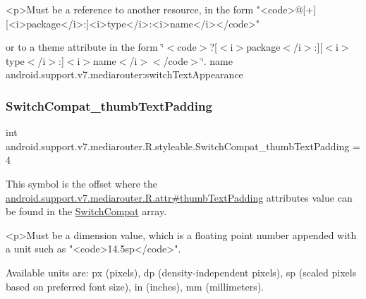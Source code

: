 \begin{DoxyVerb}      <p>Must be a reference to another resource, in the form "<code>@[+][<i>package</i>:]<i>type</i>:<i>name</i></code>"
\end{DoxyVerb}
 or to a theme attribute in the form \char`\"{}$<$code$>$?\mbox{[}$<$i$>$package$<$/i$>$\+:\mbox{]}\mbox{[}$<$i$>$type$<$/i$>$\+:\mbox{]}$<$i$>$name$<$/i$>$$<$/code$>$\char`\"{}.  name android.\+support.\+v7.\+mediarouter\+:switch\+Text\+Appearance \mbox{\label{classandroid_1_1support_1_1v7_1_1mediarouter_1_1R_1_1styleable_a02e44ff90f9d164c673496e2b783fb7d}} 
\subsubsection{\texorpdfstring{Switch\+Compat\+\_\+thumb\+Text\+Padding}{SwitchCompat\_thumbTextPadding}}
{\footnotesize\ttfamily int android.\+support.\+v7.\+mediarouter.\+R.\+styleable.\+Switch\+Compat\+\_\+thumb\+Text\+Padding = 4\hspace{0.3cm}{\ttfamily [static]}}

This symbol is the offset where the \hyperlink{classandroid_1_1support_1_1v7_1_1mediarouter_1_1R_1_1attr_a7468fae21c1543c65b63c2dc30a2d332}{android.\+support.\+v7.\+mediarouter.\+R.\+attr\#thumb\+Text\+Padding} attribute\textquotesingle{}s value can be found in the \hyperlink{classandroid_1_1support_1_1v7_1_1mediarouter_1_1R_1_1styleable_af5c7f83276b6c88619833dc8bebeacd9}{Switch\+Compat} array.

\begin{DoxyVerb}      <p>Must be a dimension value, which is a floating point number appended with a unit such as "<code>14.5sp</code>".
\end{DoxyVerb}
 Available units are\+: px (pixels), dp (density-\/independent pixels), sp (scaled pixels based on preferred font size), in (inches), mm (millimeters). 

